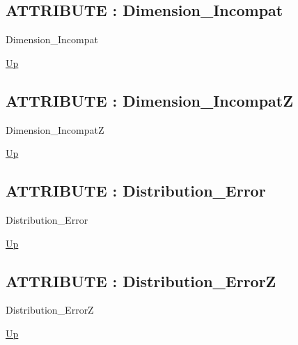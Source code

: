 \par
\par
\subsection*{ATTRIBUTE : Dimension\_Incompat}
\hypertarget{ecldoc:pbblas.constants.dimension_incompat}{}
\begin{minipage}[t]{\textwidth}
\begin{flushleft}
 Dimension\_Incompat 
\end{flushleft}
\end{minipage}
\hyperlink{ecldoc:PBblas.Constants}{Up}

\par
\par
\subsection*{ATTRIBUTE : Dimension\_IncompatZ}
\hypertarget{ecldoc:pbblas.constants.dimension_incompatz}{}
\begin{minipage}[t]{\textwidth}
\begin{flushleft}
 Dimension\_IncompatZ 
\end{flushleft}
\end{minipage}
\hyperlink{ecldoc:PBblas.Constants}{Up}

\par
\par
\subsection*{ATTRIBUTE : Distribution\_Error}
\hypertarget{ecldoc:pbblas.constants.distribution_error}{}
\begin{minipage}[t]{\textwidth}
\begin{flushleft}
 Distribution\_Error 
\end{flushleft}
\end{minipage}
\hyperlink{ecldoc:PBblas.Constants}{Up}

\par
\par
\subsection*{ATTRIBUTE : Distribution\_ErrorZ}
\hypertarget{ecldoc:pbblas.constants.distribution_errorz}{}
\begin{minipage}[t]{\textwidth}
\begin{flushleft}
 Distribution\_ErrorZ 
\end{flushleft}
\end{minipage}
\hyperlink{ecldoc:PBblas.Constants}{Up}

